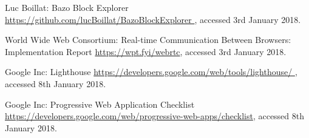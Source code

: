 \begin{thebibliography}{99}
 Luc Boillat: Bazo Block Explorer \url{https://github.com/lucBoillat/BazoBlockExplorer
}, accessed 3rd January 2018.

 World Wide Web Consortium: Real-time Communication Between Browsers: Implementation Report \url{https://wpt.fyi/webrtc}, accessed 3rd January 2018.

 Google Inc: Lighthouse \url{https://developers.google.com/web/tools/lighthouse/
}, accessed 8th January 2018.

 Google Inc: Progressive Web Application Checklist \url{https://developers.google.com/web/progressive-web-apps/checklist}, accessed 8th January 2018.


\end{thebibliography}


